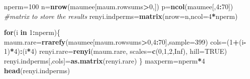\documentclass[]{article}
\newenvironment{Shaded}{\begin{snugshade}}{\end{snugshade}}
\newcommand{\KeywordTok}[1]{\textcolor[rgb]{0.13,0.29,0.53}{\textbf{#1}}}
\newcommand{\DataTypeTok}[1]{\textcolor[rgb]{0.13,0.29,0.53}{#1}}
\newcommand{\DecValTok}[1]{\textcolor[rgb]{0.00,0.00,0.81}{#1}}
\newcommand{\CommentTok}[1]{\textcolor[rgb]{0.56,0.35,0.01}{\textit{#1}}}
\newcommand{\OtherTok}[1]{\textcolor[rgb]{0.56,0.35,0.01}{#1}}
\newcommand{\ControlFlowTok}[1]{\textcolor[rgb]{0.13,0.29,0.53}{\textbf{#1}}}
\newcommand{\OperatorTok}[1]{\textcolor[rgb]{0.81,0.36,0.00}{\textbf{#1}}}
\newcommand{\NormalTok}[1]{#1}
\begin{document}
\begin{Shaded}
\begin{Highlighting}[]
\NormalTok{nperm=}\DecValTok{100}
\NormalTok{n=}\KeywordTok{nrow}\NormalTok{(maumee[maum.rowsums}\OperatorTok{>}\DecValTok{0}\NormalTok{,])}
\NormalTok{p=}\KeywordTok{ncol}\NormalTok{(maumee[,}\DecValTok{4}\OperatorTok{:}\DecValTok{70}\NormalTok{])}
\CommentTok{#matrix to store the results}
\NormalTok{renyi.indperms=}\KeywordTok{matrix}\NormalTok{(}\DataTypeTok{nrow=}\NormalTok{n,}\DataTypeTok{ncol=}\DecValTok{4}\OperatorTok{*}\NormalTok{nperm)}

\ControlFlowTok{for}\NormalTok{(i }\ControlFlowTok{in} \DecValTok{1}\OperatorTok{:}\NormalTok{nperm)\{}
\NormalTok{    maum.rare=}\KeywordTok{rrarefy}\NormalTok{(maumee[maum.rowsums}\OperatorTok{>}\DecValTok{0}\NormalTok{,}\DecValTok{4}\OperatorTok{:}\DecValTok{70}\NormalTok{],}\DataTypeTok{sample=}\DecValTok{399}\NormalTok{)}
\NormalTok{    cols=(}\DecValTok{1}\OperatorTok{+}\NormalTok{(i}\OperatorTok{-}\DecValTok{1}\NormalTok{)}\OperatorTok{*}\DecValTok{4}\NormalTok{)}\OperatorTok{:}\NormalTok{(i}\OperatorTok{*}\DecValTok{4}\NormalTok{)}
\NormalTok{    renyi.rare=}\KeywordTok{renyi}\NormalTok{(maum.rare, }\DataTypeTok{scales=}\KeywordTok{c}\NormalTok{(}\DecValTok{0}\NormalTok{,}\DecValTok{1}\NormalTok{,}\DecValTok{2}\NormalTok{,}\OtherTok{Inf}\NormalTok{), }\DataTypeTok{hill=}\OtherTok{TRUE}\NormalTok{)}
\NormalTok{    renyi.indperms[,cols]=}\KeywordTok{as.matrix}\NormalTok{(renyi.rare)}
\NormalTok{\}}
\NormalTok{maxperm=nperm}\OperatorTok{*}\DecValTok{4}
\KeywordTok{head}\NormalTok{(renyi.indperms)}
\end{Highlighting}
\end{Shaded}
\end{document}
